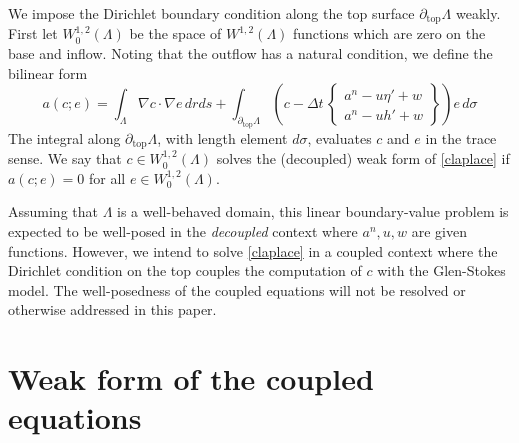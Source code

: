 \documentclass[letterpaper,final,12pt,reqno]{amsart}
\newcommand{\grad}{\nabla}
\begin{document}
We impose the Dirichlet boundary condition along the top surface $\partial_{\text{top}} \Lambda$ weakly.  First let $W_0^{1,2}(\Lambda)$ be the space of $W^{1,2}(\Lambda)$ functions which are zero on the base and inflow.  Noting that the outflow has a natural condition, we define the bilinear form
\begin{equation}
a(c;e) = \int_\Lambda \grad c \cdot \grad e \,dr ds + \int_{\partial_{\text{top}} \Lambda} \left(c - \Delta t\,\begin{Bmatrix} a^n - u \eta' + w \\ a^n - u h' + w \end{Bmatrix}\right) e\,d\sigma \label{surfaceweakform}
\end{equation}
The integral along $\partial_{\text{top}} \Lambda$, with length element $d\sigma$, evaluates $c$ and $e$ in the trace sense.  We say that $c \in W_0^{1,2}(\Lambda)$ solves the (decoupled) weak form of \eqref{claplace} if $a(c;e)=0$ for all $e \in W_0^{1,2}(\Lambda)$.

Assuming that $\Lambda$ is a well-behaved domain, this linear boundary-value problem is expected to be well-posed in the \emph{decoupled} context where $a^n,u,w$ are given functions.  However, we intend to solve \eqref{claplace} in a coupled context where the Dirichlet condition on the top couples the computation of $c$ with the Glen-Stokes model.  The well-posedness of the coupled equations will not be resolved or otherwise addressed in this paper.



\section{Weak form of the coupled equations} \label{sec:weakformcoupled}
\end{document}
